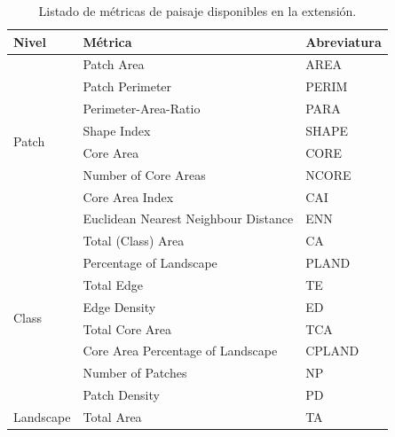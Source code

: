 \begin{table}[]
\centering
\caption{Listado de métricas de paisaje disponibles en la extensión.}
\label{tab:listmetricas}
\begin{tabular}{lll}
\hline
\textbf{Nivel}             & \textbf{Métrica}                     & \textbf{Abreviatura} \\ \hline
\multirow{8}{*}{Patch}     & Patch Area                           & AREA                 \\
                           & Patch Perimeter                      & PERIM                \\
                           & Perimeter-Area-Ratio                 & PARA                 \\
                           & Shape Index                          & SHAPE                \\
                           & Core Area                            & CORE                 \\
                           & Number of Core Areas                 & NCORE                \\
                           & Core Area Index                      & CAI                  \\
                           & Euclidean Nearest Neighbour Distance & ENN                  \\ \hline
\multirow{8}{*}{Class}     & Total (Class) Area                   & CA                   \\
                           & Percentage of Landscape              & PLAND                \\
                           & Total Edge                           & TE                   \\
                           & Edge Density                         & ED                   \\
                           & Total Core Area                      & TCA                  \\
                           & Core Area Percentage of Landscape    & CPLAND               \\
                           & Number of Patches                    & NP                   \\
                           & Patch Density                        & PD                   \\ \hline
\multirow{9}{*}{Landscape} & Total Area                           & TA                   \\

\end{tabular}
\end{table}
